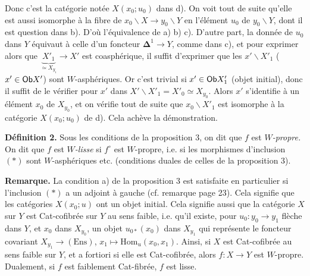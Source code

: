 Donc c'est la catégorie notée $X(x_0;u_0)$ dans d). On voit tout de suite qu'elle est aussi isomorphe à la fibre de $x_0\backslash X \longrightarrow y_0\backslash Y$ en l'élément $u_0$ de $y_0\backslash Y$, dont il est question dans b). D'où l'équivalence de a) b) c). D'autre part, la donnée de $u_0$ dans $Y$ équivaut à celle d'un foncteur $\mathbf{\Delta}^1 \longrightarrow Y$, comme dans c), et pour exprimer alors que $\underbrace{X'_1}_{\simeq X_{y_1}} \longrightarrow X'$ est coasphérique, il suffit d'exprimer que les $x'\backslash X'_1$ ($x' \in \mathsf{Ob} X'$) sont $W$-asphériques. Or c'est trivial si $x' \in \mathsf{Ob} X'_1$ (objet initial), donc il suffit de le vérifier pour $x'$ dans $X'\backslash X'_1 = X'_0 \simeq X_{y_0}$. Alors $x'$ s'identifie à un élément $x_0$ de $X_{y_0}$, et on vérifie tout de suite que $x_0\backslash X'_1$ est isomorphe à la catégorie $X(x_0;u_0)$ de d). Cela achève la démonstration.


\textbf{Définition 2.} Sous les conditions de la proposition 3, on dit que $f$ est \textit{$W$-propre.} On dit que $f$ est \textit{$W$-lisse} si $f^{\circ}$ est $W$-propre, i.e. si les morphismes d'inclusion $(*)$ sont $W$-asphériques etc. (conditions duales de celles de la proposition 3).

\textbf{Remarque.} La condition a) de la proposition 3 est satisfaite en particulier si l'inclusion $(*)$ a un adjoint à gauche (cf. remarque page 23). Cela signifie que les catégories $X(x_0;u)$ ont un objet initial. Cela signifie aussi que la catégorie $X$ sur $Y$ est Cat-cofibrée sur $Y$ au sens faible, i.e. qu'il existe, pour $u_0 : y_0 \longrightarrow y_1$ flèche dans $Y$, et $x_0$ dans $X_{y_0}$, un objet $u_{0*}(x_0)$ dans $X_{y_1}$ qui représente le foncteur covariant $X_{y_1} \longrightarrow (\mathrm{Ens})$, $x_1 \longmapsto \mathrm{Hom}_u(x_0, x_1)$. Ainsi, si $X$ est Cat-cofibrée au sens faible sur $Y$, et a fortiori si elle est Cat-cofibrée, alors $f : X \longrightarrow Y$ est $W$-propre. Dualement, si $f$ est faiblement Cat-fibrée, $f$ est lisse.


